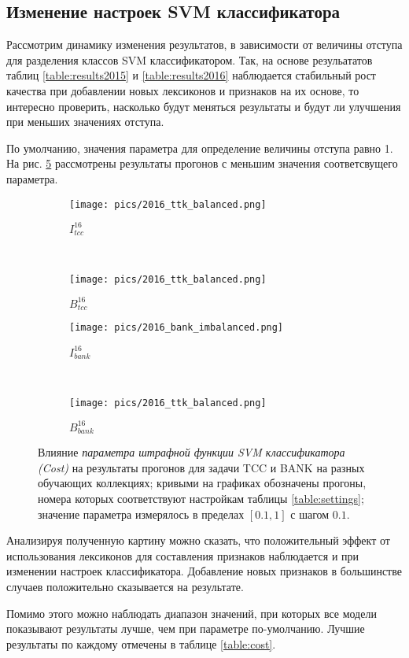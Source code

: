 \subsection{Изменение настроек SVM классификатора}
Рассмотрим динамику изменения результатов, в зависимости от величины
отступа для разделения классов SVM классификатором.
Так, на основе резульататов таблиц \ref{table:results2015} и \ref{table:results2016}
наблюдается стабильный рост качества при добавлении новых лексиконов и признаков
на их основе, то интересно проверить, насколько будут меняться результаты и
будут ли улучшения при меньших значениях отступа.

По умолчанию, значения параметра для определение величины отступа равно 1.
На рис. \ref{fig:cost} рассмотрены результаты прогонов с меньшим значения
соответсвущего параметра.
\begin{figure}[!htop] \centering
    \begin{subfigure}[b]{0.34\textwidth}
        \texttt{[image: pics/2016\_ttk\_balanced.png]}
        \caption{$I_{tcc}^{16}$}
        \label{fig:tcc_cost_changes_2015}
    \end{subfigure}
    ~
    \begin{subfigure}[b]{0.34\textwidth}
        \texttt{[image: pics/2016\_ttk\_balanced.png]}
        \caption{$B_{tcc}^{16}$}
        \label{fig:tcc_cost_changes_2016}
    \end{subfigure}

    \begin{subfigure}[b]{0.34\textwidth}
        \texttt{[image: pics/2016\_bank\_imbalanced.png]}
        \caption{$I_{bank}^{16}$}
        \label{fig:bank_cost_changes_2016}
    \end{subfigure}
    ~
    \begin{subfigure}[b]{0.34\textwidth}
        \texttt{[image: pics/2016\_ttk\_balanced.png]}
        \caption{$B_{bank}^{16}$}
        \label{fig:bank_cost_changes_2015}
    \end{subfigure}

    \caption{
        Влияние {\it параметра штрафной функции SVM классификатора (Cost)}
        на результаты прогонов для задачи TCC и BANK на разных обучающих
        коллекциях;
        кривыми на графиках обозначены прогоны, номера которых соответствуют
        настройкам таблицы \ref{table:settings};
        значение параметра измерялось в пределах $[0.1, 1]$ с шагом $0.1$.
    }
    \label{fig:cost}
\end{figure}

Анализируя полученную картину можно сказать, что положительный эффект от
использования лексиконов для составления признаков наблюдается и при
изменении настроек классификатора.
Добавление новых признаков в большинстве случаев положительно сказывается на
результате.

Помимо этого можно наблюдать диапазон значений, при которых все модели
показывают результаты лучше, чем при параметре по-умолчанию.
Лучшие результаты по каждому отмечены в таблице \ref{table:cost}.


